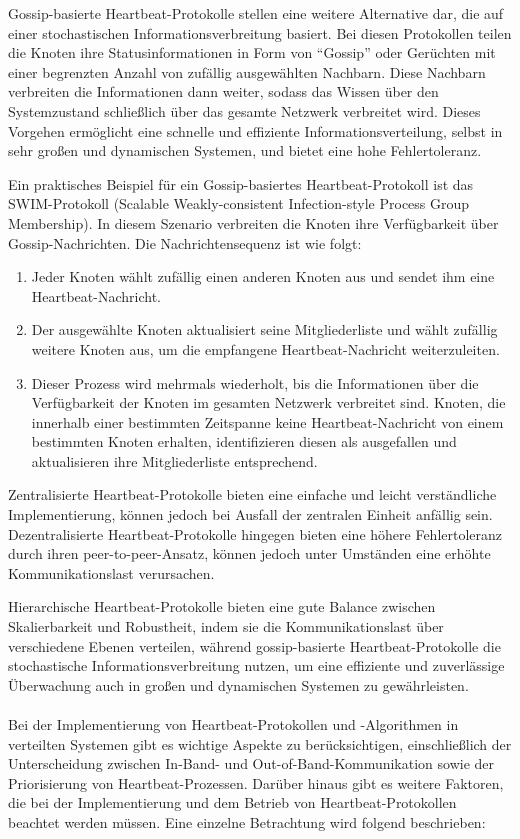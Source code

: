 \documentclass[../vs-script-first-v01.tex]{subfiles}
\begin{document}
Gossip-basierte Heartbeat-Protokolle stellen eine weitere Alternative dar, die auf einer stochastischen Informationsverbreitung basiert. Bei diesen Protokollen teilen die Knoten ihre Statusinformationen in Form von \enquote{Gossip} oder Gerüchten mit einer begrenzten Anzahl von zufällig ausgewählten Nachbarn. Diese Nachbarn verbreiten die Informationen dann weiter, sodass das Wissen über den Systemzustand schließlich über das gesamte Netzwerk verbreitet wird. Dieses Vorgehen ermöglicht eine schnelle und effiziente Informationsverteilung, selbst in sehr großen und dynamischen Systemen, und bietet eine hohe Fehlertoleranz.

Ein praktisches Beispiel für ein Gossip-basiertes Heartbeat-Protokoll ist das SWIM-Protokoll (Scalable Weakly-consistent Infection-style Process Group Membership). In diesem Szenario verbreiten die Knoten ihre Verfügbarkeit über Gossip-Nachrichten. Die Nachrichtensequenz ist wie folgt:
\begin{enumerate}[label=(\alph*)]
\item Jeder Knoten wählt zufällig einen anderen Knoten aus und sendet ihm eine Heartbeat-Nachricht.
\item Der ausgewählte Knoten aktualisiert seine Mitgliederliste und wählt zufällig weitere Knoten aus, um die empfangene Heartbeat-Nachricht weiterzuleiten.
\item Dieser Prozess wird mehrmals wiederholt, bis die Informationen über die Verfügbarkeit der Knoten im gesamten Netzwerk verbreitet sind.
Knoten, die innerhalb einer bestimmten Zeitspanne keine Heartbeat-Nachricht von einem bestimmten Knoten erhalten, identifizieren diesen als ausgefallen und aktualisieren ihre Mitgliederliste entsprechend.
\end{enumerate}

Zentralisierte Heartbeat-Protokolle bieten eine einfache und leicht verständliche Implementierung, können jedoch bei Ausfall der zentralen Einheit anfällig sein. Dezentralisierte Heartbeat-Protokolle hingegen bieten eine höhere Fehlertoleranz durch ihren peer-to-peer-Ansatz, können jedoch unter Umständen eine erhöhte Kommunikationslast verursachen.

Hierarchische Heartbeat-Protokolle bieten eine gute Balance zwischen Skalierbarkeit und Robustheit, indem sie die Kommunikationslast über verschiedene Ebenen verteilen, während gossip-basierte Heartbeat-Protokolle die stochastische Informationsverbreitung nutzen, um eine effiziente und zuverlässige Überwachung auch in großen und dynamischen Systemen zu gewährleisten.
\\\\
Bei der Implementierung von Heartbeat-Protokollen und -Algorithmen in verteilten Systemen gibt es wichtige Aspekte zu berücksichtigen, einschließlich der Unterscheidung zwischen In-Band- und Out-of-Band-Kommunikation sowie der Priorisierung von Heartbeat-Prozessen. Darüber hinaus gibt es weitere Faktoren, die bei der Implementierung und dem Betrieb von Heartbeat-Protokollen beachtet werden müssen. Eine einzelne Betrachtung wird folgend beschrieben:
\end{document}
